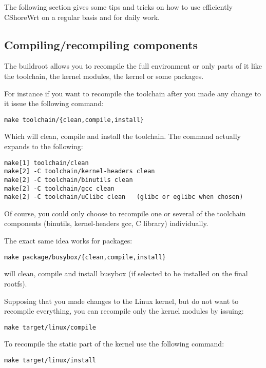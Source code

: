 The following section gives some tips and tricks on how to use efficiently
CShoreWrt on a regular basis and for daily work.

\subsection{Compiling/recompiling components}

The buildroot allows you to recompile the full environment or only parts of it
like the toolchain, the kernel modules, the kernel or some packages.

For instance if you want to recompile the toolchain after you made any change to it
issue the following command:

\begin{Verbatim}
make toolchain/{clean,compile,install}
\end{Verbatim}

Which will clean, compile and install the toolchain. The command actually expands to the
following:

\begin{Verbatim}
make[1] toolchain/clean
make[2] -C toolchain/kernel-headers clean
make[2] -C toolchain/binutils clean
make[2] -C toolchain/gcc clean
make[2] -C toolchain/uClibc clean	(glibc or eglibc when chosen)
\end{Verbatim}

Of course, you could only choose to recompile one or several of the toolchain components
(binutils, kernel-headers gcc, C library) individually.

The exact same idea works for packages:

\begin{Verbatim}
make package/busybox/{clean,compile,install}
\end{Verbatim}

will clean, compile and install busybox (if selected to be installed on the final rootfs).

Supposing that you made changes to the Linux kernel, but do not want to recompile everything,
you can recompile only the kernel modules by issuing:

\begin{Verbatim}
make target/linux/compile
\end{Verbatim}

To recompile the static part of the kernel use the following command:

\begin{Verbatim}
make target/linux/install
\end{Verbatim}

